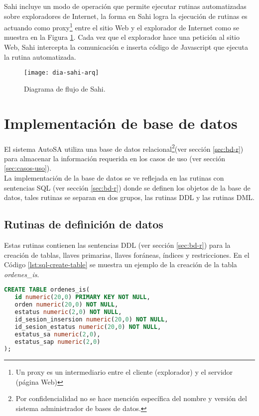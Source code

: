 Sahi incluye un modo de operación que permite ejecutar rutinas automatizadas sobre exploradores de Internet, la forma en Sahi logra la ejecución de rutinas es actuando como proxy\footnote{Un proxy es un intermediario entre el cliente (explorador) y el servidor (página Web)\cite{BeginningUbuntuLinux}} entre el sitio Web y el explorador de Internet como se muestra en la Figura \ref{fig:dia-sahi-arq}. Cada vez que el explorador hace una petición al sitio Web, Sahi intercepta la comunicación e inserta código de Javascript que ejecuta la rutina automatizada.\cite{WebEng9IntConf, SahiPro}

\begin{figure}[h]
\centering
\texttt{[image: dia-sahi-arq]}
\caption{Diagrama de flujo de Sahi\cite{SahiPro}.}
\label{fig:dia-sahi-arq}
\end{figure}

%

\section{Implementación de base de datos}
El sistema AutoSA utiliza una base de datos relacional\footnote{Por confidencialidad no se hace mención específica del nombre y versión del sistema administrador de bases de datos.}(ver sección \ref{sec:bd-r}) para almacenar la información requerida en los casos de uso (ver sección \ref{sec:casos-uso}).\\
La implementación de la base de datos se ve reflejada en las rutinas con sentencias SQL (ver sección \ref{sec:bd-r}) donde se definen los objetos de la base de datos, tales rutinas se separan en dos grupos, las rutinas DDL y las rutinas DML.

\subsection{Rutinas de definición de datos}
Estas rutinas contienen las sentencias DDL (ver sección \ref{sec:bd-r}) para la creación de tablas, llaves primarias, llaves foráneas, índices y restricciones. En el Código \ref{lst:sql-create-table} se muestra un ejemplo de la creación de la tabla \textit{ordenes\_is}.
\begin{lstlisting}[language=SQL, caption={Sentencia para crear una tabla.}, captionpos=b, label={lst:sql-create-table}]
CREATE TABLE ordenes_is(
   id numeric(20,0) PRIMARY KEY NOT NULL,
   orden numeric(20,0) NOT NULL,
   estatus numeric(2,0) NOT NULL,
   id_sesion_insersion numeric(20,0) NOT NULL,
   id_sesion_estatus numeric(20,0) NOT NULL,
   estatus_sa numeric(2,0),
   estatus_sap numeric(2,0)
);
\end{lstlisting}

